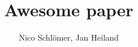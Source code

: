 \documentclass[a4paper,10pt]{article}
\title{Awesome paper}
\author{Nico Schlömer, Jan Heiland}
\begin{document}
\maketitle
\tableofcontents

\section{}



\end{document}
